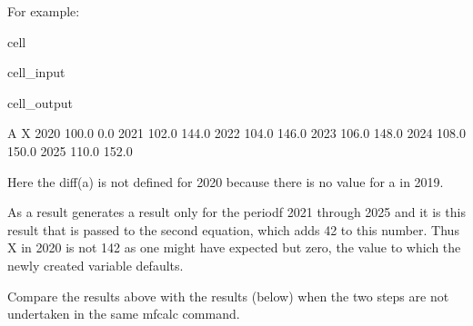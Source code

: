 \documentclass[letterpaper,10pt,english]{jupyterBook}
\begin{document}
\sphinxAtStartPar
For example:

\begin{sphinxuseclass}{cell}\begin{sphinxVerbatimInput}

\begin{sphinxuseclass}{cell_input}
\begin{sphinxVerbatim}[commandchars=\\\{\}]
  


\end{sphinxVerbatim}

\end{sphinxuseclass}\end{sphinxVerbatimInput}
\begin{sphinxVerbatimOutput}

\begin{sphinxuseclass}{cell_output}
\begin{sphinxVerbatim}[commandchars=\\\{\}]
          A      X
2020  100.0    0.0
2021  102.0  144.0
2022  104.0  146.0
2023  106.0  148.0
2024  108.0  150.0
2025  110.0  152.0
\end{sphinxVerbatim}

\end{sphinxuseclass}\end{sphinxVerbatimOutput}

\end{sphinxuseclass}
\sphinxAtStartPar
Here the diff(a) is not defined for 2020 because there is no value for a in 2019.

\sphinxAtStartPar
As a result  generates a result only for the periodf 2021 through 2025 and it is this result that is passed to the second equation, which adds 42 to this number. Thus X in 2020 is not 142 as one might have expected but zero, the value to which the newly created variable defaults.

\sphinxAtStartPar
Compare the results above with the results (below) when the two steps are not undertaken in the same mfcalc command.
\end{document}

